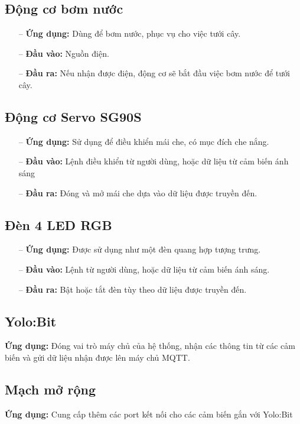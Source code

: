 \subsection{Động cơ bơm nước}
\begin{itemize}
    \item [--] \textbf{Ứng dụng:} Dùng để bơm nước, phục vụ cho việc tưới cây.
    \item [--] \textbf{Đầu vào:} Nguồn điện.
    \item [--] \textbf{Đầu ra:} Nếu nhận được điện, động cơ sẽ bắt đầu việc bơm nước để tưới cây.
\end{itemize}

\subsection{Động cơ Servo SG90S}
\begin{itemize}
    \item [--] \textbf{Ứng dụng:} Sử dụng để điều khiển mái che, có mục đích che nắng.
    \item [--] \textbf{Đầu vào:} Lệnh điều khiển từ người dùng, hoặc dữ liệu từ cảm biến ánh sáng
    \item [--] \textbf{Đầu ra:} Đóng và mở mái che dựa vào dữ liệu được truyền đến.
\end{itemize}

\subsection{Đèn 4 LED RGB}
\begin{itemize}
    \item [--] \textbf{Ứng dụng:} Được sử dụng như một đèn quang hợp tượng trưng.
    \item [--] \textbf{Đầu vào:} Lệnh từ người dùng, hoặc dữ liệu từ cảm biến ánh sáng.
    \item [--] \textbf{Đầu ra:} Bật hoặc tắt đèn tùy theo dữ liệu được truyền đến.
\end{itemize}

\subsection{Yolo:Bit}
\textbf{Ứng dụng:} Đóng vai trò máy chủ của hệ thống, nhận các thông tin từ các cảm biến và gửi dữ liệu nhận được lên máy chủ MQTT.

\subsection{Mạch mở rộng}
\textbf{Ứng dụng:} Cung cấp thêm các port kết nối cho các cảm biến gắn với Yolo:Bit
\newpage
